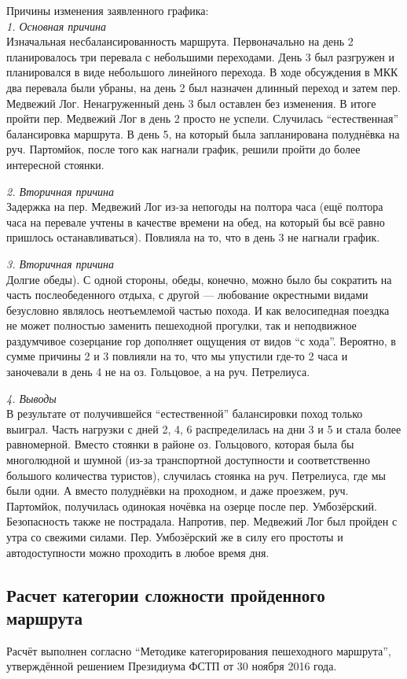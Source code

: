 Причины изменения заявленного графика:\\
\break
\textit{1. Основная причина}\\
Изначальная несбалансированность маршрута. Первоначально на день 2 планировалось три перевала с небольшими переходами.
День 3 был разгружен и планировался в виде небольшого линейного перехода.
В ходе обсуждения в МКК два перевала были убраны, на день 2 был назначен длинный переход и затем пер. Медвежий Лог.
Ненагруженный день 3 был оставлен без изменения. В итоге пройти пер. Медвежий Лог в день 2 просто не успели.
Случилась \enquote{естественная} балансировка маршрута.
В день 5, на который была запланирована полуднёвка на руч. Партомйок, после того как нагнали график,
решили пройти до более интересной стоянки.

\textit{2. Вторичная причина}\\
Задержка на пер. Медвежий Лог из-за непогоды на полтора часа (ещё полтора часа на перевале учтены в качестве времени на обед,
на который бы всё равно пришлось останавливаться).
Повлияла на то, что в день 3 не нагнали график.

\textit{3. Вторичная причина}\\
Долгие обеды). С одной стороны, обеды, конечно, можно было бы сократить на часть послеобеденного отдыха,
с другой --- любование окрестными видами безусловно являлось неотъемлемой частью похода.
И как велосипедная поездка не может полностью заменить пешеходной прогулки, так и неподвижное раздумчивое созерцание гор
дополняет ощущения от видов \enquote{с хода}.
Вероятно, в сумме причины 2 и 3 повлияли на то, что мы упустили где-то 2 часа и заночевали в день 4 не
на оз. Гольцовое, а на руч. Петрелиуса.

\textit{4. Выводы}\\
В результате от получившейся \enquote{естественной} балансировки поход только выиграл. Часть нагрузки с дней 2, 4, 6
распределилась на дни 3 и 5 и стала более равномерной. Вместо стоянки в районе оз. Гольцового,
которая была бы многолюдной и шумной (из-за транспортной доступности и соответственно большого количества туристов),
случилась стоянка на руч. Петрелиуса, где мы были одни. А вместо полуднёвки на проходном, и даже проезжем, руч. Партомйок,
получилась одинокая ночёвка на озерце после пер. Умбозёрский. Безопасность также не пострадала.
Напротив, пер. Медвежий Лог был пройден с утра со свежими силами. Пер. Умбозёрский же в силу его простоты и автодоступности
можно проходить в любое время дня.

\subsection{Расчет категории сложности пройденного маршрута}
Расчёт выполнен согласно \enquote{Методике категорирования пешеходного маршрута},
утверждённой решением Президиума ФСТП от 30 ноября 2016 года.

